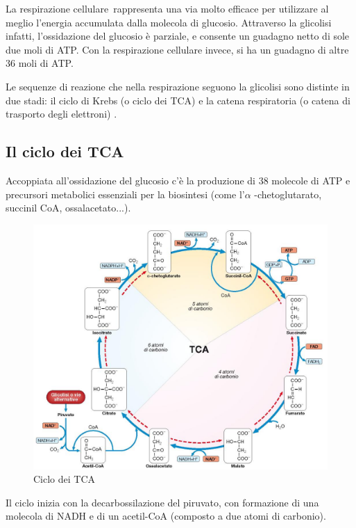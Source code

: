 \documentclass[11pt]{book}
\begin{document}
\vspace{1em}
La respirazione cellulare rappresenta una via molto efficace per utilizzare al meglio l'energia accumulata dalla molecola di glucosio. Attraverso la glicolisi infatti, l'ossidazione del glucosio è parziale, e consente un guadagno netto di sole due moli di ATP. Con la respirazione cellulare invece, si ha un guadagno di altre 36 moli di ATP. 

\vspace{1em}
Le sequenze di reazione che nella respirazione seguono la glicolisi sono distinte in due stadi: il ciclo di Krebs (o ciclo dei TCA) e la catena respiratoria (o catena di trasporto degli elettroni) . 


\clearpage
\subsection{Il ciclo dei TCA}
Accoppiata all’ossidazione del glucosio c'è la produzione di 38 molecole di ATP e precursori metabolici essenziali per la biosintesi (come l'$\alpha$ -chetoglutarato, succinil CoA, ossalacetato...). 

\begin{figure}[htp]
\centering
\includegraphics[scale=0.4]{img/Ciclo dei TCA.png}
\caption{Ciclo dei TCA}
\label{}
\end{figure}


Il ciclo inizia con la decarbossilazione del piruvato, con formazione di una molecola di NADH e di un acetil-CoA (composto a due atomi di carbonio). 
\end{document}
